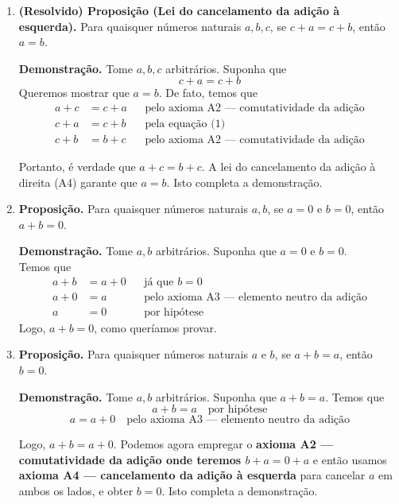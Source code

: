 \documentclass[12pt,a4paper]{article}
\begin{document}
\begin{enumerate}[label=(\alph*)]
    \item \textbf{(Resolvido) Proposição (Lei do cancelamento da adição à esquerda).} Para quaisquer números naturais $a, b, c$, se $c + a = c + b$, então $a = b$.

    \textbf{Demonstração.} Tome $a, b, c$ arbitrários. Suponha que
    \[
        c + a = c + b \tag{1}
    \]
    Queremos mostrar que $a = b$. De fato, temos que
    \begin{align*}
        a + c &= c + a && \text{pelo axioma A2 — comutatividade da adição} \\
        c + a &= c + b && \text{pela equação (1)} \\
        c + b &= b + c && \text{pelo axioma A2 — comutatividade da adição}
    \end{align*}

    Portanto, é verdade que $a + c = b + c$. A lei do cancelamento da adição à direita (A4) garante que $a = b$. Isto completa a demonstração.

    \item \textbf{Proposição.} Para quaisquer números naturais $a, b$, se $a = 0$ e $b = 0$, então $a + b = 0$.

    \textbf{Demonstração.} Tome $a, b$ arbitrários. Suponha que $a = 0$ e $b = 0$.\\
    Temos que
    \begin{align*}
        a + b &= a + 0 && \text{já que $b = 0$} \\
        a + 0 &= a && \text{pelo axioma A3 — elemento neutro da adição} \\
        a &= 0 && \text{por hipótese}
    \end{align*}
    Logo, $a + b = 0$, como queríamos provar.

    \item \textbf{Proposição.} Para quaisquer números naturais $a$ e $b$, se $a + b = a$, então $b = 0$.

    \textbf{Demonstração.} Tome $a, b$ arbitrários. Suponha que $a + b = a$. Temos que
    \[
    a + b = a \quad \text{por hipótese}
    \]
    \[
    a = a + 0 \quad \text{pelo axioma A3 — elemento neutro da adição}
    \]
    
    Logo, $a + b = a + 0$.  
    Podemos agora empregar o \textbf{axioma A2 — comutatividade da adição onde teremos $b + a = 0 + a$} e então usamos \textbf{axioma A4 — cancelamento da adição à esquerda} para cancelar $a$ em ambos os lados, e obter $b = 0$.  
    Isto completa a demonstração.
    

\end{enumerate}
\end{document}
